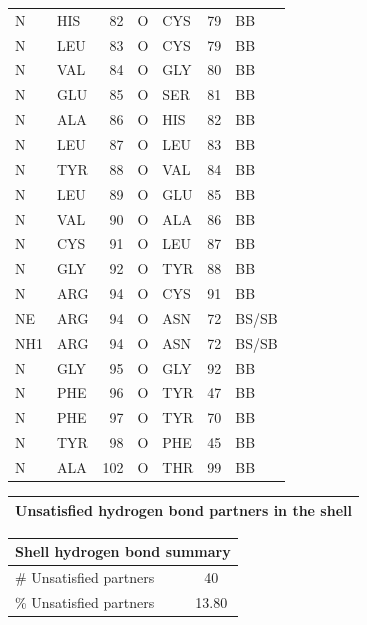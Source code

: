 \documentclass[11pt,twoside,letterpaper]{article}
\begin{document}
\begin{center}
\begin{longtable}{llr>{\hspace{1.2cm}}llr>{\hspace{1.2cm}}l}
		N & HIS & 82 & O & CYS & 79 & BB\\
		N & LEU & 83 & O & CYS & 79 & BB\\
		N & VAL & 84 & O & GLY & 80 & BB\\
		N & GLU & 85 & O & SER & 81 & BB\\
		N & ALA & 86 & O & HIS & 82 & BB\\
		N & LEU & 87 & O & LEU & 83 & BB\\
		N & TYR & 88 & O & VAL & 84 & BB\\
		N & LEU & 89 & O & GLU & 85 & BB\\
		N & VAL & 90 & O & ALA & 86 & BB\\
		N & CYS & 91 & O & LEU & 87 & BB\\
		N & GLY & 92 & O & TYR & 88 & BB\\
		N & ARG & 94 & O & CYS & 91 & BB\\
		NE & ARG & 94 & O & ASN & 72 & BS/SB\\
		NH1 & ARG & 94 & O & ASN & 72 & BS/SB\\
		N & GLY & 95 & O & GLY & 92 & BB\\
		N & PHE & 96 & O & TYR & 47 & BB\\
		N & PHE & 97 & O & TYR & 70 & BB\\
		N & TYR & 98 & O & PHE & 45 & BB\\
		N & ALA & 102 & O & THR & 99 & BB\\
	\end{longtable}
\end{center}

\newpage
\begin{table}[!h]
	\begin{center}
		\begin{tabular}{p{16.1cm}}
			\midrule
			\cellcolor[gray]{0.9}\textbf{Unsatisfied hydrogen bond partners in the shell}\\
			\midrule
		\end{tabular}
	\end{center}
\end{table}
\begin{table}[!h]
	\begin{center}
		\begin{tabular}{l@{\hspace{1cm}}c}
		\toprule
		\multicolumn{2}{c}{\cellcolor[gray]{0.9} \textbf{Shell hydrogen bond summary}} \\
			\midrule
			\# Unsatisfied partners & 40\\
			\% Unsatisfied partners & 13.80\\
			\midrule
		\end{tabular}
	\end{center}
\end{table}
\end{document}
